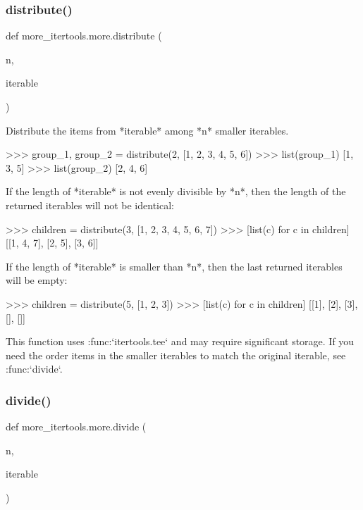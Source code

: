 \subsubsection{\texorpdfstring{distribute()}{distribute()}}
{\footnotesize\ttfamily def more\+\_\+itertools.\+more.\+distribute (\begin{DoxyParamCaption}\item[{}]{n,  }\item[{}]{iterable }\end{DoxyParamCaption})}

\begin{DoxyVerb}Distribute the items from *iterable* among *n* smaller iterables.

    >>> group_1, group_2 = distribute(2, [1, 2, 3, 4, 5, 6])
    >>> list(group_1)
    [1, 3, 5]
    >>> list(group_2)
    [2, 4, 6]

If the length of *iterable* is not evenly divisible by *n*, then the
length of the returned iterables will not be identical:

    >>> children = distribute(3, [1, 2, 3, 4, 5, 6, 7])
    >>> [list(c) for c in children]
    [[1, 4, 7], [2, 5], [3, 6]]

If the length of *iterable* is smaller than *n*, then the last returned
iterables will be empty:

    >>> children = distribute(5, [1, 2, 3])
    >>> [list(c) for c in children]
    [[1], [2], [3], [], []]

This function uses :func:`itertools.tee` and may require significant
storage. If you need the order items in the smaller iterables to match the
original iterable, see :func:`divide`.\end{DoxyVerb}
 \mbox{\label{namespacemore__itertools_1_1more_a363458a199debec3da9306dc6e182f83}} 
\subsubsection{\texorpdfstring{divide()}{divide()}}
{\footnotesize\ttfamily def more\+\_\+itertools.\+more.\+divide (\begin{DoxyParamCaption}\item[{}]{n,  }\item[{}]{iterable }\end{DoxyParamCaption})}

